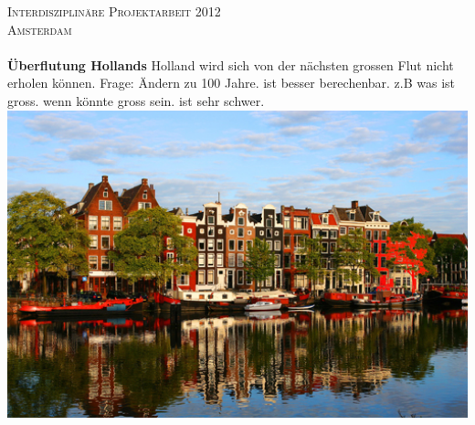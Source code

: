 
\begin{titlepage}

\begin{center}


\textsc{\LARGE Interdisziplinäre Projektarbeit 2012}\\[1.5cm]

\textsc{\Large Amsterdam}\\[0.5cm]

  
\HRule \\[0.4cm] 
{ \huge \bfseries Überflutung Hollands}
\newline
Holland wird sich von der nächsten grossen Flut nicht erholen können.
Frage: Ändern zu 100 Jahre. ist besser berechenbar. z.B was ist gross. wenn könnte gross sein. ist sehr schwer.
\HRule \\[0.4cm]  
  
 
\includegraphics[width=1\textwidth]{images/titelbild.jpg}
\cite{titelbild}   
\\[1cm]   
  
 
 

\end{center}
\end{titlepage}
